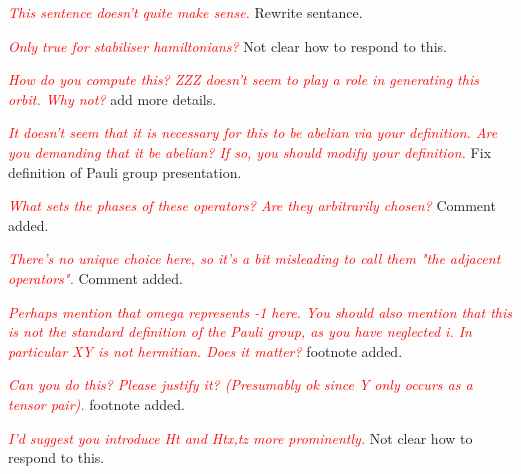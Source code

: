 \documentclass[11pt,oneside]{article}
\newcommand{\danbrowne}[1]{\vspace{10pt}\noindent\textcolor{red}{{\it #1}}}
\newcommand{\Field}{\mathcal{F}}
\begin{document}
\danbrowne{This sentence doesn't quite make sense.}
Rewrite sentance.

\danbrowne{Only true for stabiliser hamiltonians?}
Not clear how to respond to this.

\danbrowne{How do you compute this? ZZZ doesn't seem to play a role in generating this orbit. Why not?}
add more details.

\danbrowne{It doesn't seem that it is necessary for this to be abelian via your definition. Are you demanding that it be abelian? If so, you should modify your definition. }
Fix definition of Pauli group presentation.


\danbrowne{What sets the phases of these operators? Are they arbitrarily chosen?}
Comment added.


\danbrowne{There's no unique choice here, so it's a bit misleading to call them "the adjacent operators". }
Comment added.


\danbrowne{Perhaps mention that omega represents -1 here.  You should also mention that this is not the standard definition of the Pauli group, as you have neglected i.  In particular XY is not hermitian. Does it matter?}
footnote added.


\danbrowne{Can you do this? Please justify it? (Presumably ok since Y only occurs as a tensor pair). } 
footnote added.


\danbrowne{I'd suggest you introduce Ht and Htx,tz more prominently. }
Not clear how to respond to this.

\end{document}
